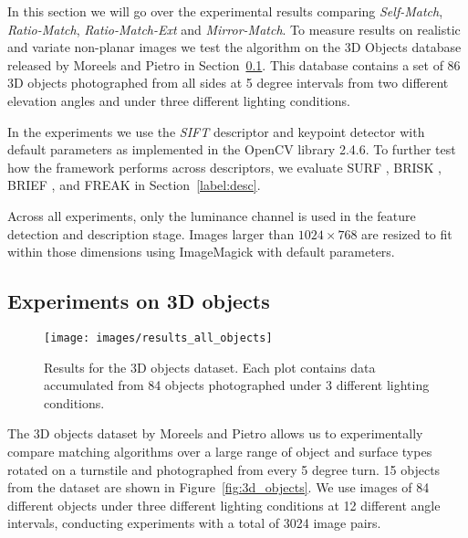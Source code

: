 \documentclass[10pt,journal,cspaper,compsoc]{IEEEtran}
\begin{document}
In this section we will go over the experimental results comparing 
\emph{Self-Match}, \emph{Ratio-Match}, \emph{Ratio-Match-Ext} and 
\emph{Mirror-Match}. To measure results on realistic and 
variate non-planar images we test the algorithm on the 3D Objects 
database released by Moreels and Pietro \cite{moreels2007evaluation} in 
Section~\ref{S:3dobjects}. This database contains a set of 86 3D objects 
photographed from all sides at 5 degree intervals from two different 
elevation angles and under three different lighting conditions.

In the experiments we use the \emph{SIFT} descriptor and keypoint 
detector with default parameters as implemented in the OpenCV library 
2.4.6.  To further test how the framework performs across descriptors, we 
evaluate SURF \cite{bay2006surf}, BRISK \cite{leutenegger2011brisk}, 
BRIEF \cite{calonder2010brief}, and FREAK \cite{alahi2012freak} in 
Section~\ref{label:desc}. 

Across all experiments, only the luminance channel is used in the feature detection and description stage. Images larger than $1024\!\times\!768$ are resized to fit within those dimensions using ImageMagick with default parameters.  

\subsection{Experiments on 3D objects}
\label{S:3dobjects}


\begin{figure*}[t]
	\centering
    \texttt{[image: images/results\_all\_objects]}
    \caption{Results for the 3D objects dataset. Each plot 
    contains data accumulated from 84 objects photographed under 3 
different lighting conditions.}
    \label{fig:all_objects}
\end{figure*}


The 3D objects dataset by Moreels and Pietro \cite{moreels2007evaluation} allows us to experimentally compare matching 
algorithms over a large range of object and surface types rotated on a 
turnstile and photographed from every 5 degree turn.  15 objects from the dataset are shown in Figure~\ref{fig:3d_objects}.  We use images of 
84 different objects under three different lighting conditions at 12 
different angle intervals, conducting experiments with a total of 3024 
image pairs.  
\end{document}
